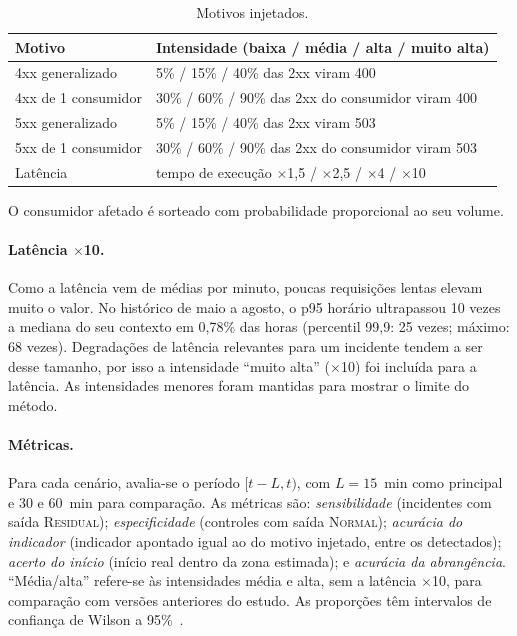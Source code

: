 \documentclass[sigconf,nonacm]{acmart}
\newcommand{\Normal}{\textsc{Normal}\xspace}
\newcommand{\Residual}{\textsc{Residual}\xspace}
\begin{document}
\begin{table}[t]
  \caption{Motivos injetados.}
  \label{tab:falhas}
  \small
  \begin{tabular}{p{}p{}}
    \toprule
    Motivo & Intensidade (baixa / média / alta / muito alta) \\
    \midrule
    4xx generalizado & 5\% / 15\% / 40\% das 2xx viram 400 \\
    4xx de 1 consumidor & 30\% / 60\% / 90\% das 2xx do consumidor viram 400 \\
    5xx generalizado & 5\% / 15\% / 40\% das 2xx viram 503 \\
    5xx de 1 consumidor & 30\% / 60\% / 90\% das 2xx do consumidor viram 503 \\
    Latência & tempo de execução $\times$1,5 / $\times$2,5 / $\times$4 / $\times$10 \\
    \bottomrule
  \end{tabular}
  \par\smallskip\footnotesize O consumidor afetado é sorteado com probabilidade proporcional ao seu volume.
\end{table}

\paragraph{Latência $\times$10.} Como a latência vem de médias por minuto, poucas requisições lentas elevam muito o valor. No histórico de maio a agosto, o p95 horário ultrapassou 10 vezes a mediana do seu contexto em 0,78\% das horas (percentil 99,9: 25 vezes; máximo: 68 vezes). Degradações de latência relevantes para um incidente tendem a ser desse tamanho, por isso a intensidade ``muito alta'' ($\times$10) foi incluída para a latência. As intensidades menores foram mantidas para mostrar o limite do método.

\paragraph{Métricas.} Para cada cenário, avalia-se o período $[t-L,t)$, com $L=15$~min como principal e 30 e 60~min para comparação. As métricas são: \emph{sensibilidade} (incidentes com saída \Residual); \emph{especificidade} (controles com saída \Normal); \emph{acurácia do indicador} (indicador apontado igual ao do motivo injetado, entre os detectados); \emph{acerto do início} (início real dentro da zona estimada); e \emph{acurácia da abrangência}. ``Média/alta'' refere-se às intensidades média e alta, sem a latência $\times$10, para comparação com versões anteriores do estudo. As proporções têm intervalos de confiança de Wilson a 95\%~\citep{wilson1927probable}.
\end{document}
